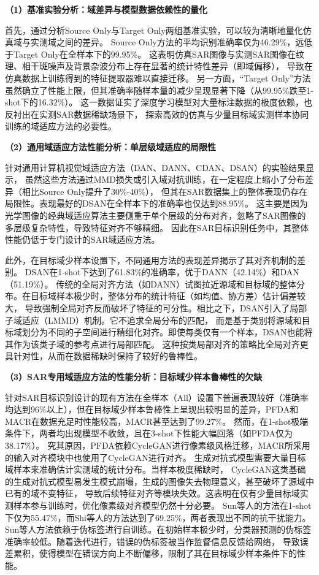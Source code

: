 \textbf{（1）基准实验分析：域差异与模型数据依赖性的量化}

首先，通过分析Source Only与Target Only两组基准实验，可以较为清晰地量化仿真域与实测域之间的差异。
Source Only方法的平均识别准确率仅为46.29\%，远低于Target Only在全样本下的99.95\%。
这表明仿真SAR图像与实测SAR图像在纹理、相干斑噪声及背景杂波分布上存在显著的统计特性差异（即域偏移），
导致在仿真数据上训练得到的特征提取器难以直接迁移。
另一方面，“Target Only”方法虽然确立了性能上限，但其准确率随样本量的减少呈现显著下降（从99.95\%跌至1-shot下的16.32\%）。
这一数据证实了深度学习模型对大量标注数据的极度依赖，也反衬出在实测SAR数据稀缺场景下，
探索高效的仿真与少量目标域实测样本协同训练的域适应方法的必要性。

\textbf{（2）通用域适应方法性能分析：单层级域适应的局限性}

针对通用计算机视觉域适应方法（DAN、DANN、CDAN、DSAN）的实验结果显示，
虽然这些方法通过MMD损失或引入域对抗训练，在一定程度上缩小了分布差异（相比Source Only提升了30\%-40\%），
但其在SAR数据集上的整体表现仍存在局限性。表现最好的DSAN在全样本下的准确率也仅达到88.95\%。
这主要是因为光学图像的经典域适应算法主要侧重于单个层级的分布对齐，忽略了SAR图像的多层级复杂特性，导致特征对齐不够精细。
因此在SAR目标识别任务中，其整体性能仍低于专门设计的SAR域适应方法。

此外，在目标域少样本设置下，不同通用方法的表现差异揭示了其对齐机制的差别。
DSAN\cite{zhu2020deep}在1-shot下达到了61.83\%的准确率，优于DANN（42.14\%）和DAN（51.19\%）。
传统的全局对齐方法（如DANN）试图拉近源域和目标域的整体分布。在目标域样本极少时，整体分布的统计特征（如均值、协方差）估计偏差较大，
导致强制全局对齐反而破坏了特征的可分性。相比之下，DSAN引入了局部子域适应（LMMD）机制。它不追求全局分布的匹配，
而是基于类别将源域和目标域划分为不同的子空间进行精细化对齐。即使每类仅有一个样本，DSAN也能将其作为该类子域的参考点进行局部匹配。
这种按类局部对齐的策略比全局对齐更具针对性，从而在数据稀缺时保持了较好的鲁棒性。

\textbf{（3）SAR专用域适应方法的性能分析：目标域少样本鲁棒性的欠缺}

针对SAR目标识别设计的现有方法在全样本（All）设置下普遍表现较好（准确率均达到96\%以上），但在目标域少样本鲁棒性上呈现出较明显的差异，PFDA和MACR在数据充足时性能较高，MACR甚至达到了99.27\%。
然而，在1-shot极端条件下，两者均出现模型不收敛，且在3-shot下性能大幅回落（如PFDA仅为38.17\%）。
究其原因，PFDA依赖CycleGAN进行像素级风格迁移，MACR所采用的输入对齐模块中也使用了CycleGAN进行对齐。
生成对抗式模型需要大量目标域样本来准确估计实测域的统计分布。当样本极度稀缺时，
CycleGAN这类基础的生成对抗式模型易发生模式崩塌，生成的图像失去物理意义，甚至破坏了源域中已有的域不变特征，
导致后续特征对齐等模块失效。这表明在仅有少量目标域实测样本参与训练时，优化像素级对齐模型仍然十分必要。
Sun等人的方法在1-shot下仅为55.47\%，而Shi等人\cite{shi2024unsupervised}的方法达到了69.25\%，两者表现出不同的抗干扰能力。
Sun等人方法依赖于伪标签进行自训练。在初始样本极少时，分类器预测的伪标签准确率较低。随着迭代进行，错误的伪标签被当作监督信息反馈给网络，
导致误差累积，使得模型在错误方向上不断偏移，限制了其在目标域少样本条件下的性能。

